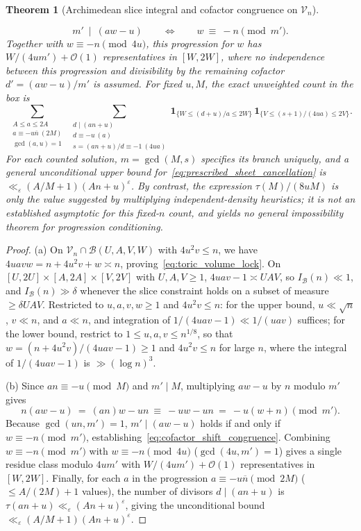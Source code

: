 \documentclass[11pt, a4paper]{article}
\theoremstyle{plain}
\newtheorem{theorem}{Theorem}[section]
\theoremstyle{definition}
\begin{document}
\begin{theorem}[Archimedean slice integral and cofactor congruence on $\mathcal{V}_n$]
\begin{enumerate}[(a)]
    \begin{equation}\label{eq:cofactor_shift_congruence}
    m'\ \mid\ (aw-u)\qquad\Longleftrightarrow\qquad w\ \equiv\ -n\pmod{m'}.
    \end{equation}
    Together with $w\equiv-n\pmod{4u}$, this progression for $w$ has $W/(4um')+\mathcal{O}(1)$ representatives in $[W,2W]$, where no independence between this progression and divisibility by the remaining cofactor $d'=(aw-u)/m'$ is assumed. For fixed $u,M$, the exact unweighted count in the box is
    \begin{equation}\label{eq:prescribed_sheet_cancellation}
    \sum_{\substack{A\le a\le 2A\\ a\equiv-u\overline{n}\ (2M)\\ \gcd(a,u)=1}}\ \sum_{\substack{d\mid(an+u)\\ d\equiv-u\ (a)\\ s=(an+u)/d\equiv-1\ (4ua)}}\mathbf{1}_{\{W\le(d+u)/a\le 2W\}}\,\mathbf{1}_{\{V\le(s+1)/(4ua)\le 2V\}}.
    \end{equation}
    For each counted solution, $m=\gcd(M,s)$ specifies its branch uniquely, and a general unconditional upper bound for~\eqref{eq:prescribed_sheet_cancellation} is $\ll_\varepsilon(A/M+1)(An+u)^{\varepsilon}$. By contrast, the expression $\tau(M)/(8uM)$ is only the value suggested by multiplying independent-density heuristics; it is not an established asymptotic for this fixed-$n$ count, and yields no general impossibility theorem for progression conditioning.
\end{enumerate}
\end{theorem}
\begin{proof}
(a) On $\mathcal{V}_n\cap\mathcal{B}(U,A,V,W)$ with $4u^{2}v\le n$, we have $4uavw=n+4u^{2}v+w\asymp n$, proving~\eqref{eq:toric_volume_lock}. On $[U,2U]\times[A,2A]\times[V,2V]$ with $U,A,V\ge1$, $4uav-1\asymp UAV$, so $I_{\mathcal{B}}(n)\ll 1$, and $I_{\mathcal{B}}(n)\gg\delta$ whenever the slice constraint holds on a subset of measure $\ge\delta UAV$. Restricted to $u,a,v,w\ge1$ and $4u^{2}v\le n$: for the upper bound, $u\ll\sqrt{n}$, $v\ll n$, and $a\ll n$, and integration of $1/(4uav-1)\ll 1/(uav)$ suffices; for the lower bound, restrict to $1\le u,a,v\le n^{1/8}$, so that $w=(n+4u^{2}v)/(4uav-1)\ge1$ and $4u^{2}v\le n$ for large $n$, where the integral of $1/(4uav-1)$ is $\gg(\log n)^{3}$.

(b) Since $an\equiv-u\pmod M$ and $m'\mid M$, multiplying $aw-u$ by $n$ modulo $m'$ gives
\[
n(aw-u)\ =\ (an)w-un\ \equiv\ -uw-un\ =\ -u(w+n)\pmod{m'}.
\]
Because $\gcd(un,m')=1$, $m'\mid(aw-u)$ holds if and only if $w\equiv-n\pmod{m'}$, establishing~\eqref{eq:cofactor_shift_congruence}. Combining $w\equiv-n\pmod{m'}$ with $w\equiv-n\pmod{4u}$ ($\gcd(4u,m')=1$) gives a single residue class modulo $4um'$ with $W/(4um')+\mathcal{O}(1)$ representatives in $[W,2W]$. Finally, for each $a$ in the progression $a\equiv-u\overline{n}\pmod{2M}$ ($\le A/(2M)+1$ values), the number of divisors $d\mid(an+u)$ is $\tau(an+u)\ll_\varepsilon(An+u)^{\varepsilon}$, giving the unconditional bound $\ll_\varepsilon(A/M+1)(An+u)^{\varepsilon}$.
\end{proof}
\end{document}
